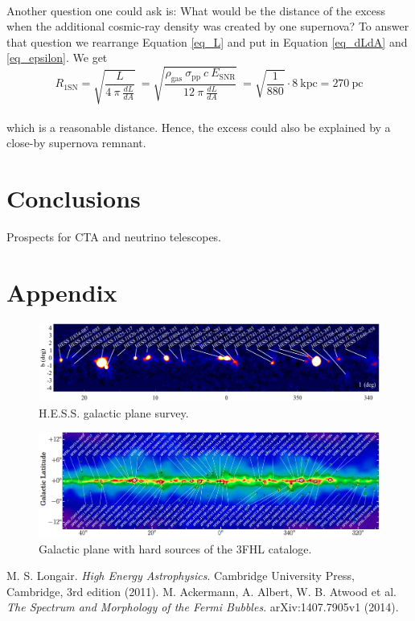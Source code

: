 \documentclass[a4paper]{article}
\begin{document}
\\
Another question one could ask is: What would be the distance of the excess when the additional cosmic-ray density was created by one supernova? To answer that question we rearrange Equation \ref{eq_L} and put in Equation \ref{eq_dLdA} and \ref{eq_epsilon}. We get
\begin{equation}
R_\text{1SN} = \sqrt{\frac{L}{4\ \pi\ \frac{dL}{dA}}}\ = \sqrt{\frac{\rho_\text{gas}\ \sigma_\text{pp}\ c\ E_\text{SNR}}{12\ \pi\ \frac{dL}{dA}}}\ = \sqrt{\frac{1}{880}}\cdot 8\ \text{kpc} = 270\ \text{pc}
\end{equation}\\
which is a reasonable distance. Hence, the excess could also be explained by a close-by supernova remnant.








\section{Conclusions}
Prospects for CTA and neutrino telescopes.


\section*{Appendix}
\begin{figure}[h]
	\centering
	\includegraphics[width=1.\textwidth]{HESS_GalacticPlaneSurvey}
    \caption{H.E.S.S.
     galactic plane survey.}
    \label{TotalData_Sum}
\end{figure}
\begin{figure}[h]
	\centering
	\includegraphics[width=1.\textwidth]{3FHL}
    \caption{Galactic plane with hard sources of the 3FHL cataloge.}
    \label{TotalData_Sum}
\end{figure}



\begin{thebibliography}{9}
	 M. S. Longair. \textit{High Energy Astrophysics}. Cambridge University Press, Cambridge, 3rd edition (2011).
	 M. Ackermann, A. Albert, W. B. Atwood et al. \textit{The Spectrum and Morphology of the \textit{Fermi} Bubbles}. arXiv:1407.7905v1 (2014).\\
\end{thebibliography}
\end{document}
